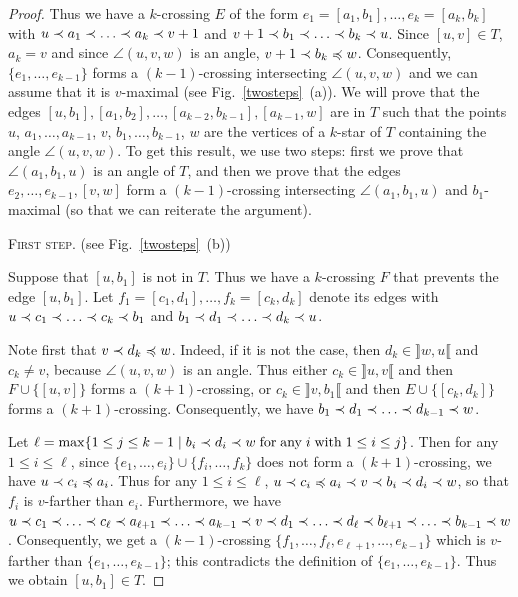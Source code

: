\documentclass[12pt]{amsart}
\begin{document}
\begin{proof}
Thus we have a $k$-crossing $E$ of the form $e_1=[a_1,b_1],\ldots,e_k=[a_k,b_k]$ with $u\prec a_1\prec \ldots\prec a_k\prec v+1$ and $v+1\prec b_1\prec \ldots\prec b_k\prec u$. Since $[u,v]\in T$, $a_k=v$ and since $\angle(u,v,w)$ is an angle, $v+1\prec b_k\preccurlyeq w$. Consequently, $\{e_1,\ldots,e_{k-1}\}$ forms a $(k-1)$-crossing intersecting $\angle(u,v,w)$ and we can assume that it is $v$-maximal (see Fig.~\ref{twosteps}~(a)). We will prove that the edges $[u,b_1], [a_1,b_2],\ldots, [a_{k-2},b_{k-1}],[a_{k-1},w]$ are in $T$ such that the points $u$, $a_1,\ldots,a_{k-1}$, $v$, $b_1,\ldots,b_{k-1}$, $w$ are the vertices of a $k$-star of $T$ containing the angle $\angle(u,v,w)$. To get this result, we use two steps: first we prove that $\angle(a_1,b_1,u)$ is an angle of $T$, and then we prove that the edges $e_2,\ldots,e_{k-1},[v,w]$ form a $(k-1)$-crossing intersecting $\angle(a_1,b_1,u)$ and $b_1$-maximal (so that we can reiterate the argument).

\medskip
\noindent\textsc{First step.} (see Fig.~\ref{twosteps}~(b))

Suppose that $[u,b_1]$ is not in $T$. Thus we have a $k$-crossing $F$ that prevents the edge $[u,b_1]$. Let $f_1=[c_1,d_1],\ldots,f_k=[c_k,d_k]$ denote its edges with $u\prec c_1\prec \ldots\prec c_k\prec b_1$ and $b_1\prec d_1\prec \ldots\prec d_k\prec u$.

Note first that $v\prec d_k\preccurlyeq w$. Indeed, if it is not the case, then $d_k\in\rrbracket w,u\llbracket$ and $c_k\ne v$, because $\angle(u,v,w)$ is an angle. Thus either $c_k\in\rrbracket u,v\llbracket$ and then $F\cup\{[u,v]\}$ forms a $(k+1)$-crossing, or $c_k\in\rrbracket v,b_1\llbracket$ and then $E\cup\{[c_k,d_k]\}$ forms a $(k+1)$-crossing. Consequently, we have $b_1\prec d_1\prec \ldots\prec d_{k-1}\prec w$.

Let $\ell=\max\{1\le j\le {k-1}\;|\; b_i\prec d_i\prec w\;\mathrm{for\;any}\; i\;\mathrm{with}\;1\le i\le j\}$. Then for any $1\le i\le\ell$, since $\{e_1,\ldots,e_i\}\cup\{f_i,\ldots,f_k\}$ does not form a $(k+1)$-crossing, we have $u\prec c_i\preccurlyeq a_i$. Thus for any $1\le i\le\ell$, $u\prec c_i\preccurlyeq a_i\prec v\prec b_i\prec d_i\prec w$, so that $f_i$ is $v$-farther than $e_i$. Furthermore, we have $u\prec c_1\prec \ldots\prec c_\ell\prec a_{\ell+1}\prec\ldots\prec a_{k-1}\prec v\prec d_1\prec\ldots\prec d_\ell\prec b_{\ell+1}\prec \ldots\prec b_{k-1}\prec w$. Consequently, we get a $(k-1)$-crossing $\{f_1,\ldots,f_\ell,e_{\ell+1},\ldots,e_{k-1}\}$ which is $v$-farther than $\{e_1,\ldots,e_{k-1}\}$; this contradicts the definition of $\{e_1,\ldots,e_{k-1}\}$. Thus we obtain $[u,b_1]\in T$.


\end{proof}
\end{document}
